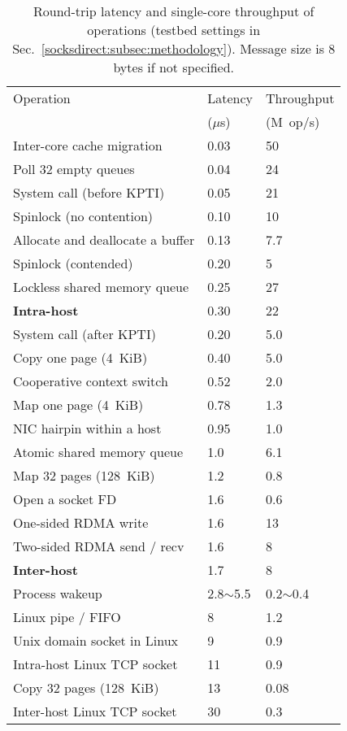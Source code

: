 \begin{table}[t]
	\centering
		\begin{tabular}{l|l|l|}
			\hline
			Operation	& Latency  & Throughput  \\
			& ($\mu$s) & (M~op/s) \\
			\hline
			\hline
			Inter-core cache migration	& 0.03 & 50 \\
			\hline
			Poll 32 empty queues & 0.04 & 24 \\
			\hline
			System call (before KPTI) & 0.05 & 21 \\
			\hline
			Spinlock (no contention) & 0.10 & 10 \\
			\hline
			Allocate and deallocate a buffer & 0.13 & 7.7 \\
			\hline
			Spinlock (contended) & 0.20 & 5 \\
			\hline
			Lockless shared memory queue & 0.25 & 27 \\
			\hline
			\textbf{Intra-host \sys} & 0.30 & 22 \\
			\hline
			System call (after KPTI) & 0.20 & 5.0 \\
			\hline
			Copy one page (4~KiB) & 0.40 & 5.0 \\
			\hline
			Cooperative context switch & 0.52 & 2.0 \\
			\hline
			Map one page (4~KiB) & 0.78 & 1.3 \\
			\hline
			NIC hairpin within a host & 0.95 & 1.0 \\
			\hline
			Atomic shared memory queue & 1.0 & 6.1 \\
			\hline
			Map 32 pages (128~KiB) & 1.2 & 0.8 \\
			\hline
			Open a socket FD & 1.6 & 0.6 \\
			\hline
			One-sided RDMA write & 1.6 & 13 \\
			\hline
			Two-sided RDMA send / recv & 1.6 & 8 \\
			\hline
			\textbf{Inter-host \sys} & 1.7 & 8 \\
			\hline
			Process wakeup & 2.8$\sim$5.5 & 0.2$\sim$0.4 \\
			\hline
			Linux pipe / FIFO & 8 & 1.2 \\
			\hline
			Unix domain socket in Linux & 9 & 0.9 \\
			\hline
			Intra-host Linux TCP socket & 11 & 0.9 \\
			\hline
			Copy 32 pages (128~KiB) & 13 & 0.08 \\
			\hline
			Inter-host Linux TCP socket & 30 & 0.3 \\
			\hline
		\end{tabular}
	\caption{Round-trip latency and single-core throughput of operations (testbed settings in Sec.~\ref{socksdirect:subsec:methodology}). Message size is 8 bytes if not specified.}
	\label{socksdirect:tab:operation-performance}
	
\end{table}


